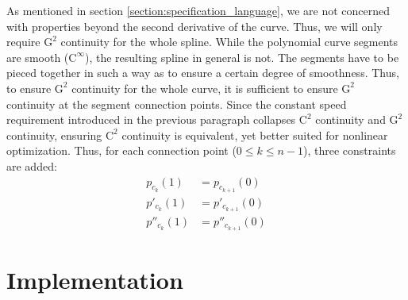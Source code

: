 \documentclass[a4paper]{article}
\newcommand{\apply}[2]{#1\!\left(#2\right)}
\begin{document}
				As mentioned in section \ref{section:specification_language}, we are not concerned with properties beyond the second derivative of the curve. Thus, we will only require \(\mathrm{G}^2\) continuity for the whole spline. While the polynomial curve segments are smooth (\(\mathrm{C}^\infty\)), the resulting spline in general is not. The segments have to be pieced together in such a way as to ensure a certain degree of smoothness. Thus, to ensure \(\mathrm{G}^2\) continuity for the whole curve, it is sufficient to ensure \(\mathrm{G}^2\) continuity at the segment connection points. Since the constant speed requirement introduced in the previous paragraph collapses \(\mathrm{C}^2\) continuity and \(\mathrm{G}^2\) continuity, ensuring \(\mathrm{C}^2\) continuity is equivalent, yet better suited for nonlinear optimization. Thus, for each connection point (\(0 \leq k \leq n - 1\)), three constraints are added:
				\begin{align*}
					\apply{p_{c_k}}{1}   & = \apply{p_{c_{k+1}}}{0}\\
					\apply{p'_{c_k}}{1}  & = \apply{p'_{c_{k+1}}}{0}\\
					\apply{p''_{c_k}}{1} & = \apply{p''_{c_{k+1}}}{0}
				\end{align*}



	\section{Implementation}

\end{document}
